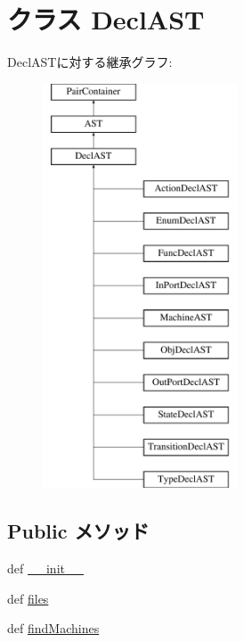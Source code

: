 \hypertarget{classslicc_1_1ast_1_1DeclAST_1_1DeclAST}{
\section{クラス DeclAST}
\label{classslicc_1_1ast_1_1DeclAST_1_1DeclAST}
}
DeclASTに対する継承グラフ:\begin{figure}[H]
\begin{center}
\leavevmode
\includegraphics[height=12cm]{classslicc_1_1ast_1_1DeclAST_1_1DeclAST}
\end{center}
\end{figure}
\subsection*{Public メソッド}
\begin{DoxyCompactItemize}
\item 
def \hyperlink{classslicc_1_1ast_1_1DeclAST_1_1DeclAST_ac775ee34451fdfa742b318538164070e}{\_\-\_\-init\_\-\_\-}
\item 
def \hyperlink{classslicc_1_1ast_1_1DeclAST_1_1DeclAST_a35b1a87f6fcbddeb5b793b0e415765f8}{files}
\item 
def \hyperlink{classslicc_1_1ast_1_1DeclAST_1_1DeclAST_a716f8a2874cc6a4d0c5ed3c2f90f236d}{findMachines}
\end{DoxyCompactItemize}



